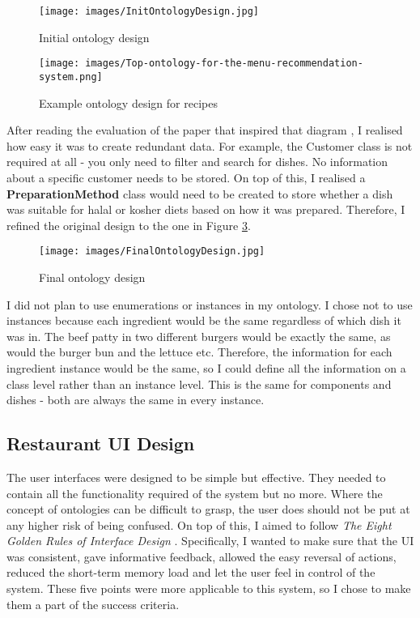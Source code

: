 \begin{figure}[h]
    \centering
    \captionsetup{justification=centering}
    \texttt{[image: images/InitOntologyDesign.jpg]}
    \caption{Initial ontology design}
    \label{fig:init_ontology_design}
\end{figure}

\begin{figure}[h]
    \centering
    \captionsetup{justification=centering}
    \texttt{[image: images/Top-ontology-for-the-menu-recommendation-system.png]}
    \caption{Example ontology design for recipes\cite{ontology_pitfalls}}
    \label{fig:recipe_ontology_design}
\end{figure}

After reading the evaluation of the paper that inspired that diagram \cite{ontology_pitfalls}, I realised how easy it was to create redundant data. For example, the Customer class is not required at all - you only need to filter and search for dishes. No information about a specific customer needs to be stored. On top of this, I realised a \textbf{PreparationMethod} class would need to be created to store whether a dish was suitable for halal or kosher diets based on how it was prepared. Therefore, I refined the original design to the one in Figure \ref{fig:final_ontology_design}.

\begin{figure}[h]
    \centering
    \captionsetup{justification=centering}
    \texttt{[image: images/FinalOntologyDesign.jpg]}
    \caption{Final ontology design}
    \label{fig:final_ontology_design}
\end{figure}

I did not plan to use enumerations or instances in my ontology. I chose not to use instances because each ingredient would be the same regardless of which dish it was in. The beef patty in two different burgers would be exactly the same, as would the burger bun and the lettuce etc. Therefore, the information for each ingredient instance would be the same, so I could define all the information on a class level rather than an instance level. This is the same for components and dishes - both are always the same in every instance.

\subsection{Restaurant UI Design}

The user interfaces were designed to be simple but effective. They needed to contain all the functionality required of the system but no more. Where the concept of ontologies can be difficult to grasp, the user does should not be put at any higher risk of being confused. On top of this, I aimed to follow \textit{The Eight Golden Rules of Interface Design} \cite{shneiderman}. Specifically, I wanted to make sure that the UI was consistent, gave informative feedback, allowed the easy reversal of actions, reduced the short-term memory load and let the user feel in control of the system. These five points were more applicable to this system, so I chose to make them a part of the success criteria.

